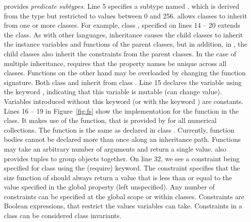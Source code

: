\noindent \Klang{} provides {\em predicate subtypes}. Line 5 specifies
a subtype named , which is derived from the  type
but restricted to values between 0 and 256. \Klang{} allows classes to
inherit from one or more classes. For example, class ,
specified on lines 14 -- 20 extends the  class. As with
other languages, inheritance causes the child classes to inherit the
instance variables and functions of the parent classes, but in
addition, in \Klang{}, the child classes also inherit the constraints
from the parent classes. In the case of multiple inheritance, \Klang{}
requires that the property names be unique across all
classes. Functions on the other hand may be overloaded by changing the
function signature. Both class  and  inherit from
class . 
Line 15 declares the variable  using the keyword ,
indicating that this variable is mutable (can change value). Variables introduced
without this keyword (or with the keyword ) are constants.
Lines 16 -- 19 in Figure~\ref{fig:fs} show the
implementation for the  function in the 
class. It makes use of the  function, that is provided by
\Klang{} for all numerical collections. The  function is
the same as declared in class . Currently, function bodies
cannot be declared more than once along an inheritance path. Functions
may take an arbitrary number of arguments and return a single
value. \Klang{} also provides tuples to group objects together. On
line 32, we see a constraint being specified for class 
using the  (require) keyword. The constraint specifies that
the size function of  should always return a value that is
less than or equal to the value specified in the global property
 (left unspecified). Any number of constraints
can be specified at the global scope or within classes. Constraints
are Boolean expressions, that restrict the values variables can
take. Constraints in a class can be considered class invariants.

